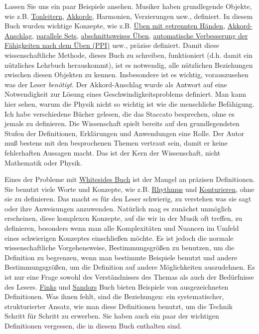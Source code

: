 Lassen Sie uns ein paar Beispiele ansehen.
Musiker haben grundlegende Objekte, wie z.B. \hyperref[c1iii5a]{Tonleitern}, \hyperref[c1iii7e]{Akkorde}, Harmonien, Verzierungen usw., definiert.
In diesem Buch wurden wichtige Konzepte, wie z.B. \hyperref[c1ii7]{Üben mit getrennten Händen}, \hyperref[c1ii9]{Akkord-Anschlag}, \hyperref[c1ii11]{parallele Sets}, \hyperref[c1ii5]{abschnittsweises Üben}, \hyperref[c1ii15]{automatische Verbesserung der Fähigkeiten nach dem Üben (PPI)} usw., präzise definiert.
Damit diese wissenschaftliche Methode, dieses Buch zu schreiben, funktioniert (d.h. damit ein nützliches Lehrbuch herauskommt), ist es notwendig, alle nützlichen Beziehungen zwischen diesen Objekten zu kennen.
Insbesondere ist es wichtig, vorauszusehen was der Leser \textit{benötigt}.
Der Akkord-Anschlag wurde als Antwort auf eine Notwendigkeit zur Lösung eines Geschwindigkeitsproblems definiert.
Man kann hier sehen, warum die Physik nicht so wichtig ist wie die menschliche Befähigung.
Ich habe verschiedene Bücher gelesen, die das Staccato besprechen, ohne es jemals zu definieren.
Die Wissenschaft spielt bereits auf den grundlegendsten Stufen der Definitionen, Erklärungen und Anwendungen eine Rolle.
Der Autor muß bestens mit den besprochenen Themen vertraut sein, damit er keine fehlerhaften Aussagen macht.
Das ist der Kern der Wissenschaft, nicht Mathematik oder Physik.

Eines der Probleme mit \hyperref[Whiteside]{Whitesides Buch} ist der Mangel an präzisen Definitionen.
Sie benutzt viele Worte und Konzepte, wie z.B. \hyperref[c1iii1b]{Rhythmus} und \hyperref[c1iii8]{Konturieren}, ohne sie zu definieren.
Das macht es für den Leser schwierig, zu verstehen was sie sagt oder ihre Anweisungen anzuwenden.
Natürlich mag es zunächst unmöglich erscheinen, diese komplexen Konzepte, auf die wir in der Musik oft treffen, zu definieren, besonders wenn man alle Komplexitäten und Nuancen im Umfeld eines schwierigen Konzeptes einschließen möchte.
Es ist jedoch die normale wissenschaftliche Vorgehensweise, Bestimmungsgrößen zu benutzen, um die Definition zu begrenzen, wenn man bestimmte Beispiele benutzt und andere Bestimmungsgrößen, um die Definition auf andere Möglichkeiten auszudehnen.
Es ist nur eine Frage sowohl des Verständnisses des Themas als auch der Bedürfnisse des Lesers.
\hyperref[Fink]{Finks} und \hyperref[Sandor]{Sandors} Buch bieten Beispiele von ausgezeichneten Definitionen.
Was ihnen fehlt, sind die Beziehungen: ein systematischer, strukturierter Ansatz, wie man diese Definitionen benutzt, um die Technik Schritt für Schritt zu erwerben.
Sie haben auch ein paar der wichtigen Definitionen vergessen, die in diesem Buch enthalten sind.

